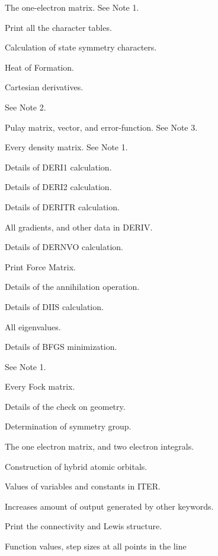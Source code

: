 \begin{description}
\item[] The one-electron matrix. See Note 1.
\item[] Print all the character tables.
\item[] Calculation of state symmetry characters.
\item[] Heat of Formation.
\item[] Cartesian derivatives.
\item[] See Note 2.
\item[] Pulay matrix, vector, and error-function. See Note 3.
\item[] Every density matrix. See Note 1.
\item[] Details of DERI1 calculation.
\item[] Details of DERI2 calculation.
\item[] Details of DERITR calculation.
\item[] All gradients, and other data in DERIV.
\item[] Details of DERNVO calculation.
\item[] Print Force Matrix. 
\item[] Details of the annihilation operation.
\item[] Details of DIIS calculation.
\item[] All eigenvalues.
\item[] Details of BFGS minimization.
\item[] See Note 1.
\item[] Every Fock matrix.
\item[] Details of the check on geometry.
\item[] Determination of symmetry group.
\item[] The one electron matrix, and two electron integrals.
\item[] Construction of hybrid atomic orbitals.
\item[] Values of variables and constants in ITER.
\item[] Increases amount of output generated by other keywords.
\item[] Print the connectivity and Lewis structure.
\item[] Function values, step sizes at all points in the line 

\end{description}
